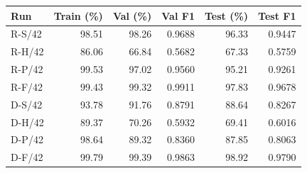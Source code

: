 \begin{tabular}{lrrrrr}
\toprule
Run & Train (\%) & Val (\%) & Val F1 & Test (\%) & Test F1\\
\midrule
R-S/42 & 98.51 & 98.26 & 0.9688 & 96.33 & 0.9447\\
R-H/42 & 86.06 & 66.84 & 0.5682 & 67.33 & 0.5759\\
R-P/42 & 99.53 & 97.02 & 0.9560 & 95.21 & 0.9261\\
R-F/42 & 99.43 & 99.32 & 0.9911 & 97.83 & 0.9678\\
D-S/42 & 93.78 & 91.76 & 0.8791 & 88.64 & 0.8267\\
D-H/42 & 89.37 & 70.26 & 0.5932 & 69.41 & 0.6016\\
D-P/42 & 98.64 & 89.32 & 0.8360 & 87.85 & 0.8063\\
D-F/42 & 99.79 & 99.39 & 0.9863 & 98.92 & 0.9790\\
\bottomrule
\end{tabular}
